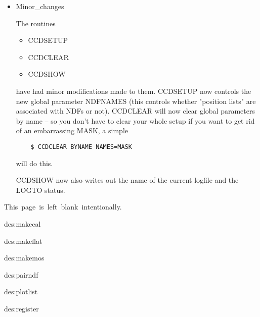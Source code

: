 \begin{itemize}
\begin{quote}
   \end{quote}

  \item Minor\_changes

   The routines
     \begin{itemize}
       \item CCDSETUP
       \item CCDCLEAR
       \item CCDSHOW
     \end{itemize}

   have had minor modifications made to them. CCDSETUP now controls
   the new global parameter NDFNAMES (this controls whether "position
   lists" are associated with NDFs or not). CCDCLEAR will now clear
   global parameters by name -- so you don't have to clear your whole
   setup if you want to get rid of an embarrassing MASK, a simple
    \begin{myquote}
    \begin{verbatim}
    $ CCDCLEAR BYNAME NAMES=MASK 
    \end{verbatim}
    \end{myquote}

   will do this.

   CCDSHOW now also writes out the name of the current logfile and 
   the LOGTO status.

\end{itemize}

\newpage
\mbox{This page is left blank intentionally.}

%
%
\newpage

                  {des:makecal}

                   {des:makeflat}

                  {des:makemos}

                  {des:pairndf}

                   {des:plotlist}

                   {des:register}

